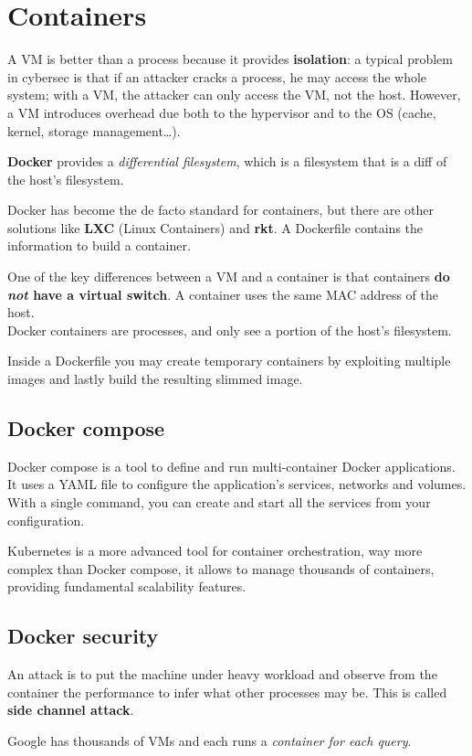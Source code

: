 \chapter{Containers}
\label{chap:containers}

A VM is better than a process because it provides \textbf{isolation}:
a typical problem in cybersec is that if an attacker cracks a process, he may access the whole system;
with a VM, the attacker can only access the VM, not the host.
However, a VM introduces overhead due both to the hypervisor and to the OS (cache, kernel, storage management\dots).


\textbf{Docker} provides a \textit{differential filesystem}, which is a filesystem that is a diff of the host's filesystem.

Docker has become the de facto standard for containers, but there are other solutions like \textbf{LXC} (Linux Containers) and \textbf{rkt}.
A Dockerfile contains the information to build a container.

One of the key differences between a VM and a container is that containers \textbf{do \textit{not} have a virtual switch}.
A container uses the same MAC address of the host.\\
Docker containers are processes, and only see a portion of the host's filesystem.

Inside a Dockerfile you may create temporary containers by exploiting multiple images and lastly build the resulting slimmed image.


\section{Docker compose}
Docker compose is a tool to define and run multi-container Docker applications. It uses a YAML file to configure the application's services, networks and volumes. With a single command, you can create and start all the services from your configuration.

Kubernetes is a more advanced tool for container orchestration, way more complex than Docker compose, it allows to manage thousands of containers, providing fundamental scalability features.

\section{Docker security}
An attack is to put the machine under heavy workload and observe from the container the performance to infer what other processes may be. This is called \textbf{side channel attack}.

Google has thousands of VMs and each runs a \textit{container for each query}.